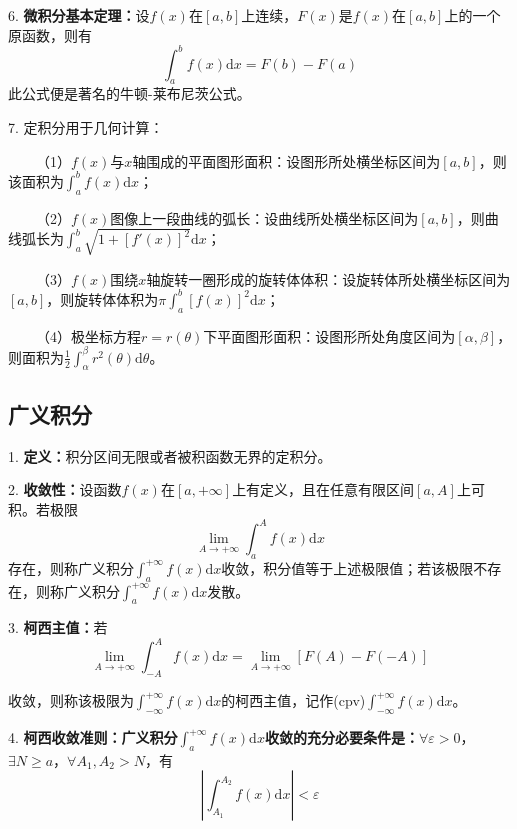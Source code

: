 6. \textbf{微积分基本定理：}设$f(x)$在$[a,b]$上连续，$F(x)$是$f(x)$在$[a,b]$上的一个原函数，则有
\begin{equation*}
    \int_a^b f(x)\mathrm{d}x=F(b)-F(a)
\end{equation*}
此公式便是著名的牛顿-莱布尼茨公式。

7. 定积分用于几何计算：

~~~~（1）$f(x)$与$x$轴围成的平面图形面积：设图形所处横坐标区间为$[a,b]$，则该面积为$\int_a^b f(x)\mathrm{d} x$；

~~~~（2）$f(x)$图像上一段曲线的弧长：设曲线所处横坐标区间为$[a,b]$，则曲线弧长为$\int_a^b \sqrt{1+\left[f'(x)\right]^2}\mathrm{d}x$；

~~~~（3）$f(x)$围绕$x$轴旋转一圈形成的旋转体体积：设旋转体所处横坐标区间为$[a,b]$，则旋转体体积为$\pi \int_a^b \left[f(x)\right]^2\mathrm{d}x$；

~~~~（4）极坐标方程$r=r(\theta)$下平面图形面积：设图形所处角度区间为$[\alpha,\beta]$，则面积为$\frac{1}{2}\int_\alpha^\beta r^2(\theta)\mathrm{d}\theta$。

\subsection{广义积分}

1. \textbf{定义：}积分区间无限或者被积函数无界的定积分。

2. \textbf{收敛性：}设函数$f(x)$在$[a,+\infty]$上有定义，且在任意有限区间$[a,A]$上可积。若极限
\begin{equation*}
    \lim\limits_{A\rightarrow +\infty}\int_a^A f(x)\mathrm{d}x
\end{equation*}
存在，则称广义积分$\int_a^{+\infty}f(x)\mathrm{d}x$收敛，积分值等于上述极限值；若该极限不存在，则称广义积分$\int_a^{+\infty}f(x)\mathrm{d}x$发散。

3. \textbf{柯西主值：}若
\begin{equation*}
    \lim\limits_{A\rightarrow +\infty}\int_{-A}^A f(x)\mathrm{d}x=\lim\limits_{A\rightarrow+\infty} \left[F(A)-F(-A)\right]
\end{equation*}

收敛，则称该极限为$\int_{-\infty}^{+\infty}f(x)\mathrm{d}x$的柯西主值，记作(cpv)$\int_{-\infty}^{+\infty}f(x)\mathrm{d}x$。

4. \textbf{柯西收敛准则：广义积分$\int_a^{+\infty}f(x)\mathrm{d}x$收敛的充分必要条件是：}$\forall \varepsilon>0$，$\exists N \geqslant a$，$\forall A_1,A_2>N$，有
\begin{equation*}
    \left|\int_{A_1}^{A_2}f(x)\mathrm{d}x\right|<\varepsilon
\end{equation*}

